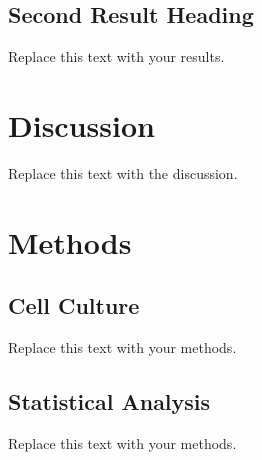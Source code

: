 \subsection{Second Result Heading}

Replace this text with your results.

\section{Discussion}

Replace this text with the discussion.

\section{Methods}

\subsection{Cell Culture}

Replace this text with your methods.

\subsection{Statistical Analysis}

Replace this text with your methods.
